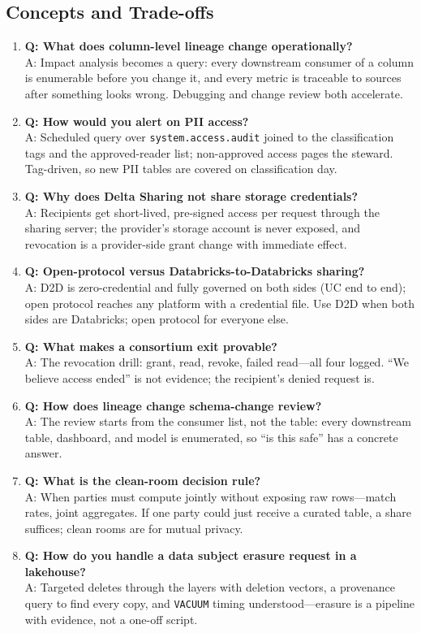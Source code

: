 \subsection{Concepts and Trade-offs}
\begin{enumerate}
    \item \textbf{Q: What does column-level lineage change operationally?}\\
    A: Impact analysis becomes a query: every downstream consumer of a column is enumerable before you change it, and every metric is traceable to sources after something looks wrong. Debugging and change review both accelerate.
    \item \textbf{Q: How would you alert on PII access?}\\
    A: Scheduled query over \texttt{system.access.audit} joined to the classification tags and the approved-reader list; non-approved access pages the steward. Tag-driven, so new PII tables are covered on classification day.
    \item \textbf{Q: Why does Delta Sharing not share storage credentials?}\\
    A: Recipients get short-lived, pre-signed access per request through the sharing server; the provider's storage account is never exposed, and revocation is a provider-side grant change with immediate effect.
    \item \textbf{Q: Open-protocol versus Databricks-to-Databricks sharing?}\\
    A: D2D is zero-credential and fully governed on both sides (UC end to end); open protocol reaches any platform with a credential file. Use D2D when both sides are Databricks; open protocol for everyone else.
    \item \textbf{Q: What makes a consortium exit provable?}\\
    A: The revocation drill: grant, read, revoke, failed read---all four logged. ``We believe access ended'' is not evidence; the recipient's denied request is.
    \item \textbf{Q: How does lineage change schema-change review?}\\
    A: The review starts from the consumer list, not the table: every downstream table, dashboard, and model is enumerated, so ``is this safe'' has a concrete answer.
    \item \textbf{Q: What is the clean-room decision rule?}\\
    A: When parties must compute jointly without exposing raw rows---match rates, joint aggregates. If one party could just receive a curated table, a share suffices; clean rooms are for mutual privacy.
    \item \textbf{Q: How do you handle a data subject erasure request in a lakehouse?}\\
    A: Targeted deletes through the layers with deletion vectors, a provenance query to find every copy, and \texttt{VACUUM} timing understood---erasure is a pipeline with evidence, not a one-off script.
\end{enumerate}

